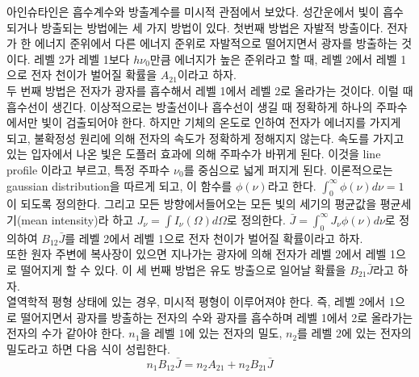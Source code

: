 아인슈타인은 흡수계수와 방출계수를 미시적 관점에서 보았다. 성간운에서 빛이 흡수되거나 방출되는 방법에는 세 가지 방법이 있다. 첫번째 방법은 자발적 방출이다. 전자가 한 에너지 준위에서 다른 에너지 준위로 자발적으로 떨어지면서 광자를 방출하는 것이다. 레벨 2가 레벨 1보다 $h\nu_0$만큼 에너지가 높은 준위라고 할 때, 레벨 2에서 레벨 1으로 전자 천이가 벌어질 확률을 $A_{21}$이라고 하자.\\
두 번째 방법은 전자가 광자를 흡수해서 레벨 1에서 레벨 2로 올라가는 것이다. 이럴 때 흡수선이 생긴다. 
이상적으로는 방출선이나 흡수선이 생길 때 정확하게 하나의 주파수에서만 빛이 검출되어야 한다. 하지만 기체의 온도로 인하여 전자가 에너지를 가지게 되고, 불확정성 원리에 의해 전자의 속도가 정확하게 정해지지 않는다. 속도를 가지고 있는 입자에서 나온 빛은 도플러 효과에 의해 주파수가 바뀌게 된다. 이것을 line profile 이라고 부르고, 특정 주파수 $\nu_0$를 중심으로 넓게 퍼지게 된다. 이론적으로는 gaussian distribution을 따르게 되고, 이 함수를 $\phi(\nu)$라고 한다. $\int_{0}^{\infty}\phi(\nu)d\nu = 1$이 되도록 정의한다. 그리고 모든 방향에서들어오는 모든 빛의 세기의 평균값을 평균세기(mean intensity)라 하고 $J_\nu=\int I_\nu(\Omega) d\Omega$로 정의한다. $\bar{J} = \int_{0}^{\infty}J_\nu\phi(\nu)d\nu$로 정의하여 $B_{12}\bar{J}$를 레벨 2에서 레벨 1으로 전자 천이가 벌어질 확률이라고 하자.\\
또한 원자 주변에 복사장이 있으면 지나가는 광자에 의해 전자가 레벨 2에서 레벨 1으로 떨어지게 할 수 있다. 이 세 번째 방법은 유도 방출으로 일어날 확률을 $B_{21} \bar{J}$라고 하자.\\
열역학적 평형 상태에 있는 경우, 미시적 평형이 이루어져야 한다. 즉, 레벨 2에서 1으로 떨어지면서 광자를 방출하는 전자의 수와 광자를 흡수하며 레벨 1에서 2로 올라가는 전자의 수가 같아야 한다. $n_1$을 레벨 1에 있는 전자의 밀도, $n_2$를 레벨 2에 있는 전자의 밀도라고 하면 다음 식이 성립한다.
\begin{equation}
n_1 B_{12} \bar{J} = n_2 A_{21} + n_2 B_{21} \bar{J}
\end{equation}


